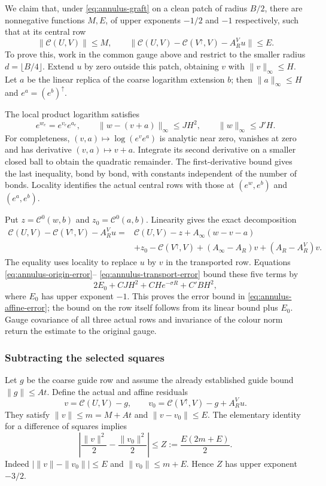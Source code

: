 We claim that, under \eqref{eq:annulus-graft} on a clean patch of
radius $B/2$, there are nonnegative functions $M,E$, of upper
exponents $-1/2$ and $-1$ respectively, such that at its central row
\begin{equation}\label{eq:annulus-affine-error}
 \|\mathcal C(U,V)\|\le M,\qquad
 \|\mathcal C(U,V)-\mathcal C(V^\uparrow,V)-A_R^Vu\|\le E.
\end{equation}
To prove this, work in the common gauge above and restrict to the
smaller radius $d=\lfloor B/4\rfloor$. Extend $u$ by zero outside
this patch, obtaining $v$ with $\|v\|_\infty\le H$. Let $a$ be
the linear replica of the coarse logarithm extension $b$; then
$\|a\|_\infty\le H$ and $e^a=(e^b)^\uparrow$.

The local product logarithm satisfies
\[
 e^{w_e}=e^{v_e}e^{a_e},\qquad
 \|w-(v+a)\|_\infty\le JH^2,\qquad
 \|w\|_\infty\le J'H.
\]
For completeness, $(v,a)\mapsto\log(e^ve^a)$ is analytic near
zero, vanishes at zero and has derivative $(v,a)\mapsto v+a$.
Integrate its second derivative on a smaller closed ball to obtain
the quadratic remainder. The first-derivative bound gives the last
inequality, bond by bond, with constants independent of the number
of bonds. Locality identifies the actual central rows with those
at $(e^w,e^b)$ and $(e^a,e^b)$.

Put $z=\mathcal C^0(w,b)$ and $z_0=\mathcal C^0(a,b)$.
Linearity gives the exact decomposition
\begin{align*}
 \mathcal C(U,V)-\mathcal C(V^\uparrow,V)-A_R^Vu
 ={}&\mathcal C(U,V)-z+A_\infty(w-v-a)\\
 &+z_0-\mathcal C(V^\uparrow,V)
 +(A_\infty-A_R)v+(A_R-A_R^V)v.
\end{align*}
The equality uses locality to replace $u$ by $v$ in the transported
row. Equations \eqref{eq:annulus-origin-error}--
\eqref{eq:annulus-transport-error} bound these five terms by
\[
 2E_0+CJH^2+CH e^{-\sigma R}+C'BH^2,
\]
where $E_0$ has upper exponent $-1$. This proves the error bound
in \eqref{eq:annulus-affine-error}; the bound on the row itself
follows from its linear bound plus $E_0$. Gauge covariance of all
three actual rows and invariance of the colour norm return the
estimate to the original gauge.

\subsubsection{Subtracting the selected squares}
Let $g$ be the coarse guide row and assume the already established
guide bound $\|g\|\le A t$. Define the actual and affine residuals
\[
 v=\mathcal C(U,V)-g,\qquad
 v_0=\mathcal C(V^\uparrow,V)-g+A_R^Vu.
\]
They satisfy $\|v\|\le m=M+At$ and $\|v-v_0\|\le E$.
The elementary identity for a difference of squares implies
\begin{equation}\label{eq:annulus-square-error}
 \left|\frac{\|v\|^2}{2}-\frac{\|v_0\|^2}{2}\right|
 \le Z:=\frac{E(2m+E)}2.
\end{equation}
Indeed $|\|v\|-\|v_0\||\le E$ and
$\|v_0\|\le m+E$. Hence $Z$ has upper exponent $-3/2$.

